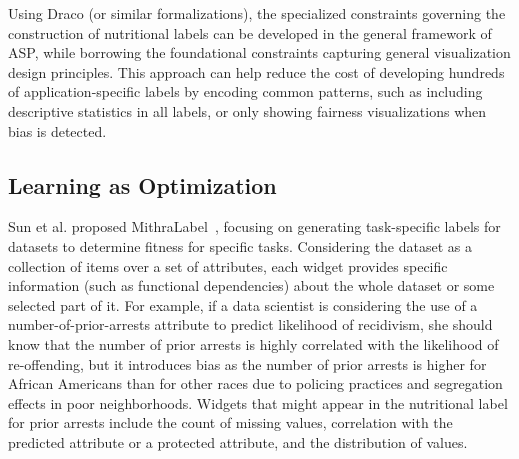 Using Draco (or similar formalizations), the specialized constraints governing the construction of nutritional labels can be developed in the general framework of ASP, while borrowing the foundational constraints capturing general visualization design principles. This approach can help reduce the cost of developing hundreds of application-specific labels by encoding common patterns, such as including descriptive statistics in all labels, or only showing fairness visualizations when bias is detected.


\subsection{Learning as Optimization}
Sun et al. proposed MithraLabel~\cite{sun2019mithralabelJ}, focusing on generating task-specific labels for datasets to determine fitness for specific tasks. Considering the dataset as a collection of items over a set of attributes, each widget provides specific information (such as functional dependencies) about the whole dataset or some selected part of it. For example, if a data scientist is considering the use of a number-of-prior-arrests attribute to predict likelihood of recidivism, she should know that the number of prior arrests is highly correlated with the likelihood of re-offending, but it introduces bias as the number of prior arrests is higher for African Americans than for other races due to policing practices and segregation effects in poor neighborhoods. Widgets that might appear in the nutritional label for prior arrests include the  count of missing values, correlation with the predicted attribute or a protected attribute, and the distribution of values.